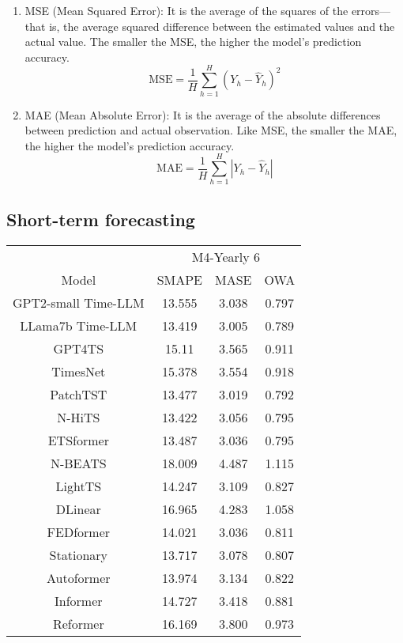 \documentclass[conference]{IEEEtran}
\begin{document}
\begin{enumerate}
    \item MSE (Mean Squared Error): It is the average of the squares of the errors—that is, the average squared difference between the estimated values and the actual value. The smaller the MSE, the higher the model's prediction accuracy.
          \[\text{MSE} = \frac{1}{H} \sum_{h=1}^{H} \left(Y_{h} - \hat{Y}_{h}\right)^2\]
    \item MAE (Mean Absolute Error): It is the average of the absolute differences between prediction and actual observation. Like MSE, the smaller the MAE, the higher the model's prediction accuracy.
          \[\text{MAE} = \frac{1}{H} \sum_{h=1}^{H} \left|Y_{h} - \hat{Y}_{h}\right|\]
\end{enumerate}


\subsection{Short-term forecasting}

\begin{tabular}{|c|c|c|c|}
    \hline
                        & \multicolumn{3}{c|}{M4-Yearly 6}                 \\
    \cline{2-4}
    Model               & SMAPE                            & MASE  & OWA   \\
    \hline
    GPT2-small Time-LLM & 13.555                           & 3.038 & 0.797 \\
    \hline
    LLama7b Time-LLM    & 13.419                           & 3.005 & 0.789 \\
    GPT4TS              & 15.11                            & 3.565 & 0.911 \\
    TimesNet            & 15.378                           & 3.554 & 0.918 \\
    PatchTST            & 13.477                           & 3.019 & 0.792 \\
    N-HiTS              & 13.422                           & 3.056 & 0.795 \\
    ETSformer           & 13.487                           & 3.036 & 0.795 \\
    N-BEATS             & 18.009                           & 4.487 & 1.115 \\
    LightTS             & 14.247                           & 3.109 & 0.827 \\
    DLinear             & 16.965                           & 4.283 & 1.058 \\
    FEDformer           & 14.021                           & 3.036 & 0.811 \\
    Stationary          & 13.717                           & 3.078 & 0.807 \\
    Autoformer          & 13.974                           & 3.134 & 0.822 \\
    Informer            & 14.727                           & 3.418 & 0.881 \\
    Reformer            & 16.169                           & 3.800 & 0.973 \\
    \hline
\end{tabular}
\end{document}
